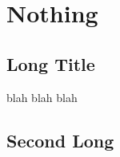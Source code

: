 \documentclass{book}
\begin{document}
\tableofcontents

\chapter{Nothing}

\section[Short Title]{Long Title}

blah blah blah

\section[Second Short]{Second Long}
\end{document}
